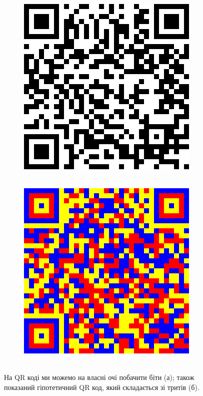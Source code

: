 \documentclass{book}
\begin{document}
\begin{figure}[t]
  \centering
  \begin{subfigure}[b]{0.45\textwidth}
    \centering
    \includegraphics[width=\textwidth]{images/qr2.png}
    \caption{~}
    \label{Pic_QR_BW}
  \end{subfigure}
  \hfill
  \begin{subfigure}[b]{0.45\textwidth}
    \centering
    \includegraphics[width=\textwidth]{images/qr3.png}
    \caption{~}
    \label{Pic_QR_Color}
  \end{subfigure}
  \caption{На QR коді ми можемо на власні очі побачити біти (а); також показаний гіпотетичний QR код, який складається зі тритів (б).}
  \label{PicQR}
\end{figure}
\end{document}
